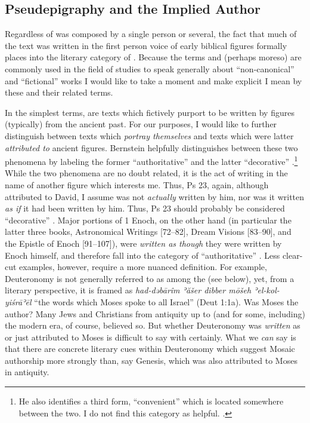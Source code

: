 
 \subsection{Pseudepigraphy and the Implied Author}

 Regardless of \ga was composed by a single person or several, the fact that much of the text was written in the first person voice of early biblical figures formally places \ga into the literary category of \psy. Because the terms \psy and (perhaps moreso) \psa are commonly used  in the field of \secondtemple studies to speak generally about ``non-canonical'' and ``fictional'' works I would like to take a moment and make explicit I mean by these and their related terms.\autocites[The topic of \psy has received a large amount of very sophisticated attention in recent years. See especially][]{mroczek2016}{tigchelaar_tigchelaar2014}{reed_towsend-moulie2011}{reed_jts2009}{reed_ditomasso-turcescu2008}{najman_hilhorst-puech2007}{najman2003}

 In the simplest terms, \psa are texts which fictively purport to be written by figures (typically) from the ancient past. For our purposes, I would like to further distinguish between texts which \emph{portray themselves} and texts which were latter \emph{attributed to} ancient figures. Bernstein helpfully distinguishes between these two phenomena by labeling the former ``authoritative'' \psy and the latter ``decorative'' \psy.\footnote{He also identifies a third form, ``convenient'' \psy which is located somewhere between the two. I do not find this category as helpful. \autocite[3--7]{bernstein_chazon-etal1999}.} While the two phenomena are no doubt related, it is the act of writing in the name of another figure which interests me. Thus, Ps 23, again, although attributed to David, I assume was not \emph{actually} written by him, nor was it written \emph{as if} it had been written by him. Thus, Ps 23 should probably be considered ``decorative'' \psy. Major portions of 1 Enoch, on the other hand (in particular the latter three books, Astronomical Writings [72--82], Dream Visions [83--90], and the Epistle of Enoch [91--107]), were \emph{written as though} they were written by Enoch himself, and therefore fall into the category of ``authoritative'' \psy. Less clear-cut examples, however, require a more nuanced definition. For example, Deuteronomy is not generally referred to as among the \psa (see below), yet, from a literary perspective, it is framed as \emph{had-dəbārîm ʾăšer dibber mōšeh ʾel-kol-yiśrāʾēl} ``the words which Moses spoke to all Israel'' (Deut 1:1a). Was Moses the author? Many Jews and Christians from antiquity up to (and for some, including) the modern era, of course, believed so. But whether Deuteronomy was \emph{written} as \psa or just attributed to Moses is difficult to say with certainly. What we \emph{can} say is that there are concrete literary cues within Deuteronomy which suggest Mosaic authorship more strongly than, say Genesis, which was also attributed to Moses in antiquity.

